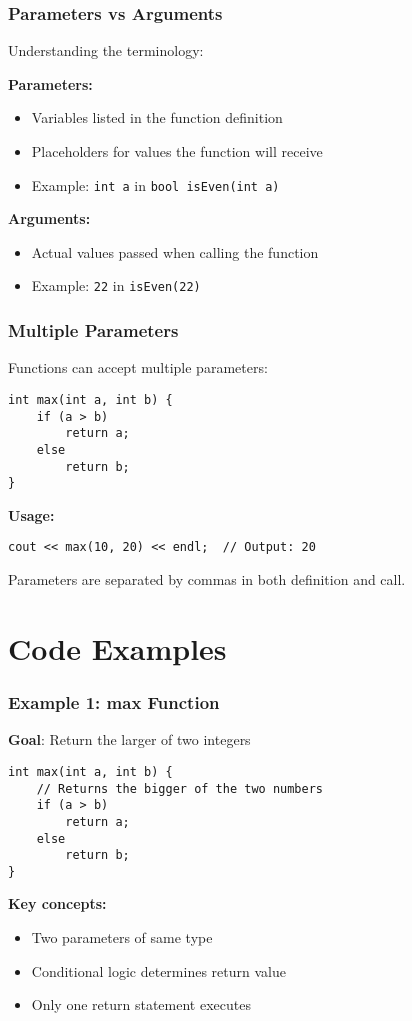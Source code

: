 \documentclass{beamer}
\begin{document}
\begin{frame}
\frametitle{Parameters vs Arguments}
Understanding the terminology:\pause

\textbf{Parameters:}
\begin{itemize}
    \item Variables listed in the function definition
    \item Placeholders for values the function will receive
    \item Example: \texttt{int a} in \texttt{bool isEven(int a)}
\end{itemize}
\pause

\textbf{Arguments:}
\begin{itemize}
    \item Actual values passed when calling the function
    \item Example: \texttt{22} in \texttt{isEven(22)}
\end{itemize}
\end{frame}

\begin{frame}[fragile]
\frametitle{Multiple Parameters}
Functions can accept multiple parameters:\pause

\begin{verbatim}
int max(int a, int b) {
    if (a > b)
        return a;
    else
        return b;
}
\end{verbatim}
\pause

\textbf{Usage:}
\begin{verbatim}
cout << max(10, 20) << endl;  // Output: 20
\end{verbatim}

Parameters are separated by commas in both definition and call.
\end{frame}

\section{Code Examples}

\begin{frame}[fragile]
\frametitle{Example 1: max Function}
\textbf{Goal}: Return the larger of two integers\pause

\begin{verbatim}
int max(int a, int b) {
    // Returns the bigger of the two numbers
    if (a > b)
        return a;
    else
        return b;
}
\end{verbatim}
\pause

\textbf{Key concepts:}
\begin{itemize}
    \item Two parameters of same type
    \item Conditional logic determines return value
    \item Only one return statement executes
\end{itemize}
\end{frame}
\end{document}
